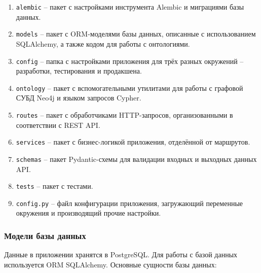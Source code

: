 \begin{enumerate}
\item \texttt{alembic} -- пакет с настройками инструмента Alembic и миграциями базы данных.
\item \texttt{models} -- пакет с ORM-моделями базы данных, описанные с использованием SQLAlchemy, а также кодом для работы с онтологиями.
\item \texttt{config} -- папка с настройками приложения для трёх разных окружений -- разработки, тестирования и продакшена.
\item \texttt{ontology} -- пакет с вспомогательными утилитами для работы с графовой СУБД Neo4j и языком запросов Cypher.
\item \texttt{routes} -- пакет с обработчиками HTTP-запросов, организованными в соответствии с REST API.
\item \texttt{services} -- пакет с бизнес-логикой приложения, отделённой от маршрутов.
\item \texttt{schemas} -- пакет Pydantic-схемы для валидации входных и выходных данных API.
\item \texttt{tests} -- пакет с тестами.
\item \texttt{config.py} -- файл конфигурации приложения, загружающий переменные окружения и производящий прочие настройки.
\end{enumerate}

\subsubsection{Модели базы данных}\label{ORM models}

Данные в приложении хранятся в PostgreSQL. Для работы с базой данных используется ORM SQLAlchemy. Основные сущности базы данных:

